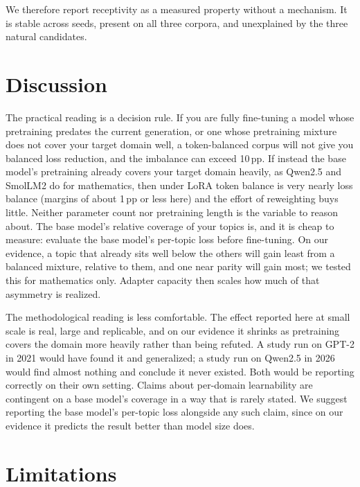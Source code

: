 \documentclass[11pt]{article}
\begin{document}
We therefore report receptivity as a measured property without a mechanism.
It is stable across seeds, present on all three corpora, and unexplained by
the three natural candidates.

\section{Discussion}

The practical reading is a decision rule. If you are fully fine-tuning a
model whose pretraining predates the current generation, or one whose
pretraining mixture does not cover your target domain well, a token-balanced
corpus will not give you balanced loss reduction, and the imbalance can
exceed 10\,pp. If instead the base model's pretraining already covers your target domain heavily, as Qwen2.5 and SmolLM2 do for mathematics, then under LoRA token balance is very nearly loss balance (margins of about 1\,pp or less here) and the effort of reweighting buys little. Neither parameter count nor pretraining length is the variable to reason
about. The base model's relative coverage of your topics is, and it is cheap
to measure: evaluate the base model's per-topic loss before fine-tuning. On our evidence, a topic that already sits well below the others will gain least from a balanced mixture, relative to them, and one near parity will gain most; we tested this for mathematics only. Adapter capacity
then scales how much of that asymmetry is realized.

The methodological reading is less comfortable. The effect reported here at
small scale is real, large and replicable, and on our evidence it shrinks as pretraining covers the domain more heavily rather than being refuted. A study run on GPT-2 in 2021
would have found it and generalized; a study run on Qwen2.5 in 2026 would
find almost nothing and conclude it never existed. Both would be reporting
correctly on their own setting. Claims about per-domain learnability are
contingent on a base model's coverage in a way that is rarely stated. We
suggest reporting the base model's per-topic loss alongside any such claim,
since on our evidence it predicts the result better than model size does.

\section*{Limitations}
\end{document}
